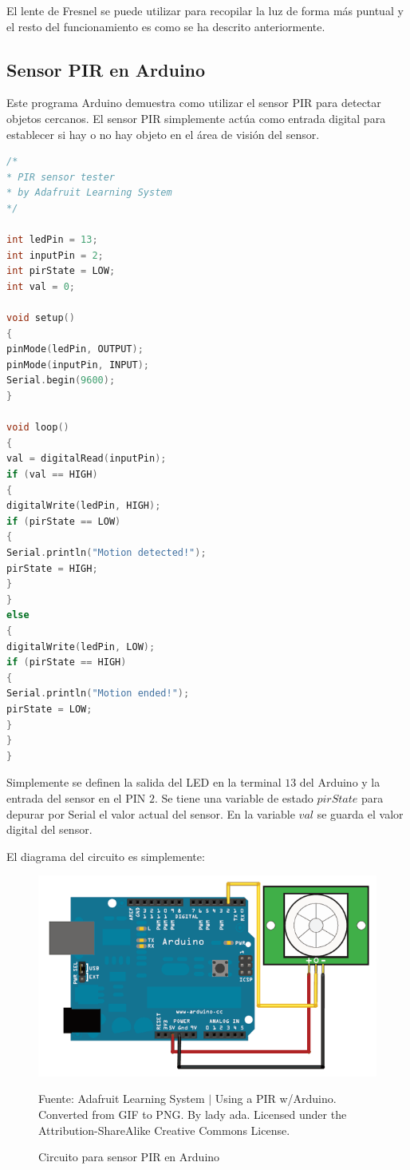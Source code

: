\documentclass[conference]{IEEEtran}
\begin{document}
    El lente de Fresnel se puede utilizar para recopilar la luz de forma más puntual y el resto del funcionamiento es como se ha descrito anteriormente.

    \subsection{Sensor PIR en Arduino}

    Este programa Arduino demuestra como utilizar el sensor PIR para detectar objetos cercanos. El sensor PIR simplemente actúa como entrada digital para establecer si hay o no hay objeto en el área de visión del sensor.

    \begin{lstlisting}[language=C, caption=Sensor PIR en Arduino. Fuente: Adafruit Learning System $\mid$ PIR Motion Sensor \cite{adafruit-learning-system-pir-sensor-2014A}]
/*
* PIR sensor tester
* by Adafruit Learning System
*/

int ledPin = 13;
int inputPin = 2;
int pirState = LOW;
int val = 0;

void setup()
{
pinMode(ledPin, OUTPUT);
pinMode(inputPin, INPUT);
Serial.begin(9600);
}

void loop()
{
val = digitalRead(inputPin);
if (val == HIGH)
{
digitalWrite(ledPin, HIGH);
if (pirState == LOW)
{
Serial.println("Motion detected!");
pirState = HIGH;
}
}
else
{
digitalWrite(ledPin, LOW);
if (pirState == HIGH)
{
Serial.println("Motion ended!");
pirState = LOW;
}
}
}
\end{lstlisting}

Simplemente se definen la salida del LED en la terminal $13$ del Arduino y la entrada del sensor en el PIN $2$. Se tiene una variable de estado $pirState$ para depurar por Serial el valor actual del sensor. En la variable $val$ se guarda el valor digital del sensor.

\bigbreak

El diagrama del circuito es simplemente:

\begin{figure}[H]
\centering
\includegraphics[width=0.3\paperwidth]{images/proximity-pir-arduino-circuit.png}
\caption{Circuito para sensor PIR en Arduino}
\footnotesize
Fuente: Adafruit Learning System $\mid$ Using a PIR w/Arduino. Converted from GIF to PNG. By lady ada. Licensed under the Attribution-ShareAlike Creative Commons License.
\end{figure}
\end{document}
